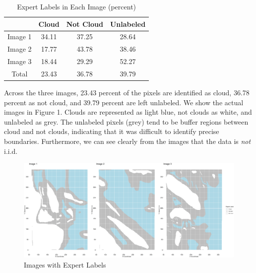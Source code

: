 \documentclass[12pt]{article}
\begin{document}
\begin{table}[h!]
\centering
\caption{Expert Labels in Each Image (percent)}
\label{table:1}
 \begin{tabular}{||c c c c||} 
 \hline
 & Cloud & Not Cloud & Unlabeled\\ 
 \hline\hline
 Image 1 & 34.11 & 37.25 & 28.64 \\ 
 Image 2 & 17.77 & 43.78 & 38.46 \\
 Image 3 & 18.44 & 29.29 & 52.27 \\
 \hline
 Total & 23.43 & 36.78 & 39.79 \\ 
 \hline
 \end{tabular}
\end{table}
\noindent Across the three images, 23.43 percent of the pixels are identified as cloud, 36.78 percent as not cloud, and 39.79 percent are left unlabeled. We show the actual images in Figure 1. Clouds are represented as light blue, not clouds as white, and unlabeled as grey. The unlabeled pixels (grey) tend to be buffer regions between cloud and not clouds, indicating that it was difficult to identify precise boundaries. Furthermore, we can see clearly from the images that the data is \textit{not} i.i.d.  
\newline
\begin{figure}[htp]
\caption{Images with Expert Labels}
\includegraphics[width=15cm]{Fig1.png}
\centering
\end{figure}
\end{document}
